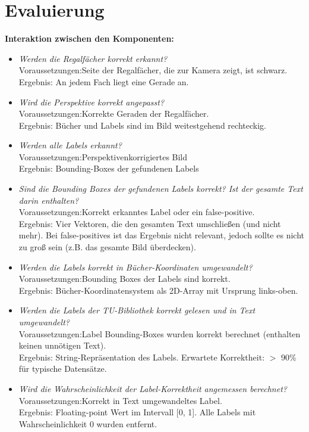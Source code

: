 \documentclass[deutsch]{scrartcl}
\newcommand\tab[1][1cm]{\hspace*{#1}}
\begin{document}
\section{Evaluierung}
\textbf{Interaktion zwischen den Komponenten:}
\begin{itemize}
	\item \textit{Werden die Regalfächer korrekt erkannt?}\\
		  Voraussetzungen:\tab Seite der Regalfächer, die zur Kamera zeigt, ist schwarz.\\
		  Ergebnis:\tab[2.2cm] An jedem Fach liegt eine Gerade an.
	\item \textit{Wird die Perspektive korrekt angepasst?}\\
		  Voraussetzungen:\tab Korrekte Geraden der Regalfächer.\\
		  Ergebnis:\tab[2.2cm] Bücher und Labels sind im Bild weitestgehend rechteckig.
	\item \textit{Werden alle Labels erkannt?}\\
		  Voraussetzungen:\tab Perspektivenkorrigiertes Bild\\
		  Ergebnis:\tab[2.2cm] Bounding-Boxes der gefundenen Labels
	\item \textit{Sind die Bounding Boxes der gefundenen Labels korrekt? Ist der gesamte Text darin enthalten?}\\
		  Voraussetzungen:\tab Korrekt erkanntes Label oder ein false-positive.\\
		  Ergebnis:\tab[2.2cm] Vier Vektoren, die den gesamten Text umschließen (und nicht mehr). Bei false-positives ist das Ergebnis nicht relevant, jedoch sollte es nicht zu groß sein (z.B. das gesamte Bild überdecken).
	\item \textit{Werden die Labels korrekt in Bücher-Koordinaten umgewandelt?}\\
		  Voraussetzungen:\tab Bounding Boxes der Labels sind korrekt.\\
		  Ergebnis:\tab[2.2cm] Bücher-Koordinatensystem als 2D-Array mit Ursprung links-oben.
	\item \textit{Werden die Labels der TU-Bibliothek korrekt gelesen und in Text umgewandelt?}\\
		  Voraussetzungen:\tab Label Bounding-Boxes wurden korrekt berechnet (enthalten keinen unnötigen Text).\\
		  Ergebnis:\tab[2.2cm] String-Repräsentation des Labels. Erwartete Korrektheit: $>$ 90\% für typische Datensätze.
	\item \textit{Wird die Wahrscheinlichkeit der Label-Korrektheit angemessen berechnet?}\\
		  Voraussetzungen:\tab Korrekt in Text umgewandeltes Label.\\
		  Ergebnis:\tab[2.2cm] Floating-point Wert im Intervall [0, 1]. Alle Labels mit Wahrscheinlichkeit 0 wurden entfernt.
\end{itemize}
\end{document}
